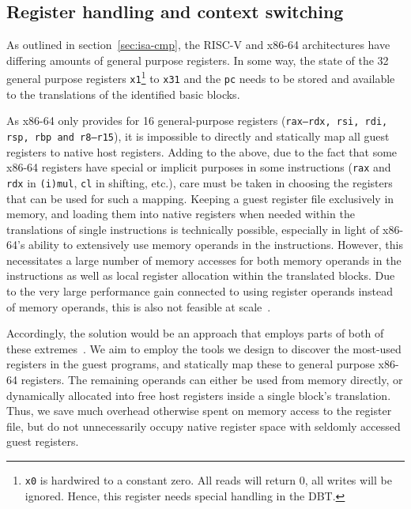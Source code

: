 \subsection{Register handling and context switching}
\label{sec:context-switch-reg-handle}
As outlined in section~\ref{sec:isa-cmp}, the RISC-V and x86-64 architectures have differing amounts of general purpose registers.
In some way, the state of the 32 general purpose registers \texttt{x1}\footnote{\texttt{x0} is hardwired to a constant zero. All reads will return 0, all writes will be ignored. Hence, this register needs special handling in the DBT.} to \texttt{x31} and the \texttt{pc} needs to be stored and available to the translations of the identified basic blocks.

As x86-64 only provides for 16 general-purpose registers (\texttt{rax--rdx, rsi, rdi, rsp, rbp and r8--r15}), it is impossible to directly and statically map all guest registers to native host registers.
Adding to the above, due to the fact that some x86-64 registers have special or implicit purposes in some instructions (\texttt{rax} and \texttt{rdx} in \texttt{(i)mul}, \texttt{cl} in shifting, etc.), care must be taken in choosing the registers that can be used for such a mapping.
Keeping a guest register file exclusively in memory, and loading them into native registers when needed within the translations of single instructions is technically possible, especially in light of x86-64's ability to extensively use memory operands in the instructions.
However, this necessitates a large number of memory accesses for both memory operands in the instructions as well as local register allocation within the translated blocks.
Due to the very large performance gain connected to using register operands instead of memory operands, this is also not feasible at scale~\cite[S. 8f.]{bintrans}.

Accordingly, the solution would be an approach that employs parts of both of these extremes~\cite[S. 9]{bintrans}.
We aim to employ the tools we design to discover the most-used registers in the guest programs, and statically map these to general purpose x86-64 registers.
The remaining operands can either be used from memory directly, or dynamically allocated into free host registers inside a single block's translation.
Thus, we save much overhead otherwise spent on memory access to the register file, but do not unnecessarily occupy native register space with seldomly accessed guest registers.





